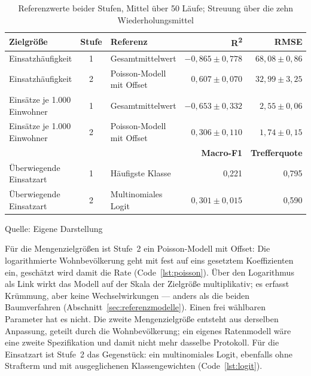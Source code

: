 \documentclass[12pt,a4paper]{article}
\renewcommand{\footnotesize}{\fontsize{10pt}{12pt}\selectfont}
\newcommand{\tabformat}{%
  \centering
  \singlespacing
  \footnotesize
  \setlength{\tabcolsep}{5pt}%
  \renewcommand{\arraystretch}{1.15}%
}
\newcommand{\tabquelle}[1][Eigene Darstellung]{%
  \par\setlength{\parskip}{0pt}\vspace{3pt}%
  {\setstretch{1}\fontsize{9pt}{11pt}\selectfont\raggedright Quelle: #1\par}%
}
\begin{document}
\begin{table}[htbp]
    \tabformat
    \caption{Referenzwerte beider Stufen, Mittel über 50 Läufe; Streuung über die zehn Wiederholungsmittel}
    \label{tab:baselines}
    \begin{tabularx}{\textwidth}{@{}L{3.9cm} c Y r r@{}}
        \toprule
        \textbf{Zielgröße} & \textbf{Stufe} & \textbf{Referenz} & \textbf{R\textsuperscript{2}} & \textbf{RMSE} \\
        \midrule
        Einsatzhäufigkeit & 1 & Gesamtmittelwert & $-0{,}865 \pm 0{,}778$ & $68{,}08 \pm 0{,}86$ \\
        Einsatzhäufigkeit & 2 & Poisson-Modell mit Offset & $0{,}607 \pm 0{,}070$ & $32{,}99 \pm 3{,}25$ \\
        Einsätze je 1.000 Einwohner & 1 & Gesamtmittelwert & $-0{,}653 \pm 0{,}332$ & $2{,}55 \pm 0{,}06$ \\
        Einsätze je 1.000 Einwohner & 2 & Poisson-Modell mit Offset & $0{,}306 \pm 0{,}110$ & $1{,}74 \pm 0{,}15$ \\
        \midrule
        & & & \textbf{Macro-F1} & \textbf{Trefferquote} \\
        \cmidrule(l){4-5}
        Überwiegende Einsatzart & 1 & Häufigste Klasse & 0,221 & 0,795 \\
        Überwiegende Einsatzart & 2 & Multinomiales Logit & $0{,}301 \pm 0{,}015$ & 0,590 \\
        \bottomrule
    \end{tabularx}
    \tabquelle
\end{table}
 
Für die Mengenzielgrößen ist Stufe~2 ein Poisson-Modell mit Offset: Die
logarithmierte Wohnbevölkerung geht mit fest auf eins gesetztem Koeffizienten
ein, geschätzt wird damit die Rate (Code~\ref{lst:poisson}). Über den
Logarithmus als Link wirkt das Modell auf der Skala der Zielgröße
multiplikativ; es erfasst Krümmung, aber keine Wechselwirkungen --- anders als
die beiden Baumverfahren (Abschnitt~\ref{sec:referenzmodelle}). Einen frei wählbaren
Parameter hat es nicht. Die zweite Mengenzielgröße entsteht aus derselben
Anpassung, geteilt durch die Wohnbevölkerung; ein eigenes Ratenmodell wäre eine
zweite Spezifikation und damit nicht mehr dasselbe Protokoll. Für die
Einsatzart ist Stufe~2 das Gegenstück: ein multinomiales Logit, ebenfalls ohne
Strafterm und mit ausgeglichenen Klassengewichten (Code~\ref{lst:logit}).
 
\end{document}
